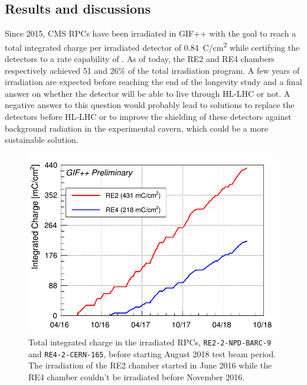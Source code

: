 	\subsection{Results and discussions}
	\label{chapt5:ssec:resultsGIFpp}
    
    Since 2015, CMS RPCs have been irradiated in GIF++ with the goal to reach a total integrated charge per irradiated detector of \SI{0.84}{C/cm^2} while certifying the detectors to a rate capability of . As of today, the RE2 and RE4 chambers respectively achieved 51 and 26\% of the total irradiation program. A few years of irradiation are expected before reaching the end of the longevity study and a final answer on whether the detector will be able to live through HL-LHC or not. A negative answer to this question would probably lead to solutions to replace the detectors before HL-LHC or to improve the shielding of these detectors against background radiation in the experimental cavern, which could be a more sustainable solution.

	\begin{figure}[H]
        \centering
		\includegraphics[width = \plotwidth]{fig/chapt5/GIFpp-Qint.png}
		\caption{\label{fig:GIFppQint} Total integrated charge in the irradiated RPCs, \texttt{RE2-2-NPD-BARC-9} and \texttt{RE4-2-CERN-165}, before starting August 2018 test beam period. The irradiation of the RE2 chamber started in June 2016 while the RE4 chamber couldn't be irradiated before November 2016.}
	\end{figure}

\clearpage{\pagestyle{empty}\cleardoublepage}